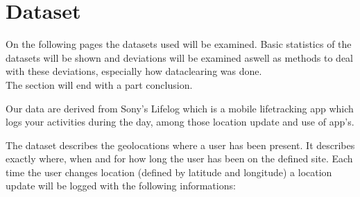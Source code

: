 \chapter{Dataset}
\label{chap:dataset}
On the following pages the datasets used will be examined. Basic statistics of the datasets will be shown and deviations will be examined aswell as methods to deal with these deviations, especially how dataclearing was done. \\
The section will end with a part conclusion. 

Our data are derived from Sony's Lifelog\cite{sonyLifeLog} which is a mobile lifetracking app which logs your activities during the day, among those location update and use of app's. 

The dataset describes the geolocations where a user has been present. It describes exactly where, when and for how long the user has been on the defined site. Each time the user changes location (defined by latitude and longitude) a location update will be logged with the following informations: 

